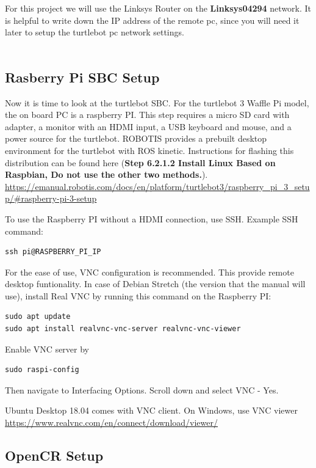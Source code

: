 \documentclass[12]{article}
\begin{document}
For this project we will use the Linksys Router on the \textbf{Linksys04294} network. It is helpful to write down the IP address of the remote pc, since you will need it later to setup the turtlebot pc network settings.\\\\

\subsection{Rasberry Pi SBC Setup}

Now it is time to look at the turtlebot SBC. For the turtlebot 3 Waffle Pi model, the on board PC is a raspberry PI. This step requires a micro SD card with adapter, a monitor with an HDMI input, a USB keyboard and mouse, and a power source for the turtlebot. ROBOTIS provides a prebuilt desktop environment for the turtlebot with ROS kinetic. Instructions for flashing this distribution can be found here (\textbf{Step 6.2.1.2 Install Linux Based on Raspbian, Do not use the other two methods.}).\\

\url {https://emanual.robotis.com/docs/en/platform/turtlebot3/raspberry_pi_3_setup/#raspberry-pi-3-setup}

To use the Raspberry PI without a HDMI connection, use SSH. Example SSH command:

\begin{lstlisting}[style=bash]
ssh pi@RASPBERRY_PI_IP
\end{lstlisting}

For the ease of use, VNC configuration is recommended. This provide remote desktop funtionality. In case of Debian Stretch (the version that the manual will use), install Real VNC by running this command on the Raspberry PI:
\begin{lstlisting}[style=bash]
sudo apt update
sudo apt install realvnc-vnc-server realvnc-vnc-viewer
\end{lstlisting}
Enable VNC server by 
\begin{lstlisting}[style=bash]
sudo raspi-config
\end{lstlisting}
Then navigate to Interfacing Options.
Scroll down and select VNC - Yes.


Ubuntu Desktop 18.04 comes with VNC client. 
On Windows, use VNC viewer
\url{https://www.realvnc.com/en/connect/download/viewer/}
\subsection{OpenCR Setup}
\end{document}
